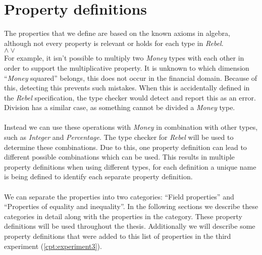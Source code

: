 \section{Property definitions}
\label{sct:properties_property_definitions}
The properties that we define are based on the known axioms in algebra, although
not every property is relevant or holds for each type in \textit{Rebel}.\\
$\land\lor$
\\
For example, it isn't possible to multiply two
\textit{Money} types with each other in order to support the multiplicative
property. It is unknown to which dimension ``\textit{Money} squared'' belongs,
this does not occur in the financial domain. Because of this, detecting this
prevents such mistakes. When this is accidentally defined in the \textit{Rebel}
specification, the type checker would detect and report this as an error.
Division has a similar case, as something cannot be divided a \textit{Money}
type.\\
\\
Instead we can use these operations with \textit{Money} in combination with
other types, such as \textit{Integer} and \textit{Percentage}. The type checker
for \textit{Rebel} will be used to determine these combinations. Due to this,
one property definition can lead to different possible combinations which can be
used. This results in multiple property definitions when using different types,
for each definition a unique name is being defined to identify each separate
property definition.\\
\\
We can separate the properties into two categories: ``Field properties'' and
``Properties of equality and inequality''. In the following sections we describe
these categories in detail along with the properties in the category. These
property definitions will be used throughout the thesis. Additionally we will
describe some property definitions that were added to this list of properties in
the third experiment (\autoref{cpt:experiment3}).


